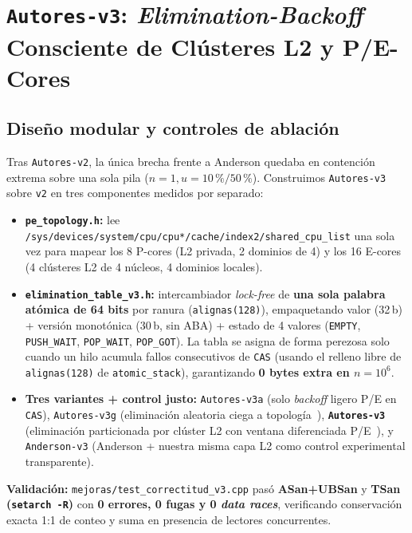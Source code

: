 \documentclass[11pt,a4paper]{article}
\begin{document}
\section{\texttt{Autores-v3}: \emph{Elimination-Backoff} Consciente de Clústeres L2 y P/E-Cores}

\subsection{Diseño modular y controles de ablación}
Tras \texttt{Autores-v2}, la única brecha frente a Anderson quedaba en contención extrema sobre una sola pila ($n=1, u=10\,\% / 50\,\%$). Construimos \texttt{Autores-v3} sobre \texttt{v2} en tres componentes medidos por separado:
\begin{itemize}
  \item \textbf{\texttt{pe\_topology.h}:} lee \texttt{/sys/devices/system/cpu/cpu*/cache/index2/shared\_cpu\_list} una sola vez para mapear los 8 P-cores (L2 privada, 2 dominios de 4) y los 16 E-cores (4 clústeres L2 de 4 núcleos, 4 dominios locales).
  \item \textbf{\texttt{elimination\_table\_v3.h}:} intercambiador \emph{lock-free} de \textbf{una sola palabra atómica de 64 bits} por ranura (\texttt{alignas(128)}), empaquetando valor (32\,b) + versión monotónica (30\,b, sin ABA) + estado de 4 valores (\texttt{EMPTY}, \texttt{PUSH\_WAIT}, \texttt{POP\_WAIT}, \texttt{POP\_GOT}). La tabla se asigna de forma perezosa solo cuando un hilo acumula fallos consecutivos de \texttt{CAS} (usando el relleno libre de \texttt{alignas(128)} de \texttt{atomic\_stack}), garantizando \textbf{0 bytes extra en $n=10^6$}.
  \item \textbf{Tres variantes + control justo:} \texttt{Autores-v3a} (solo \emph{backoff} ligero P/E en \texttt{CAS}), \texttt{Autores-v3g} (eliminación aleatoria ciega a topología~\cite{hendler2004elimination}), \textbf{\texttt{Autores-v3}} (eliminación particionada por clúster L2 con ventana diferenciada P/E~\cite{liu2022libasl,ouyang2022coreaware}), y \texttt{Anderson-v3} (Anderson + nuestra misma capa L2 como control experimental transparente).
\end{itemize}

\textbf{Validación:} \texttt{mejoras/test\_correctitud\_v3.cpp} pasó \textbf{ASan+UBSan} y \textbf{TSan (\texttt{setarch -R})} con \textbf{0 errores, 0 fugas y 0 \emph{data races}}, verificando conservación exacta 1:1 de conteo y suma en presencia de lectores concurrentes.
\end{document}
